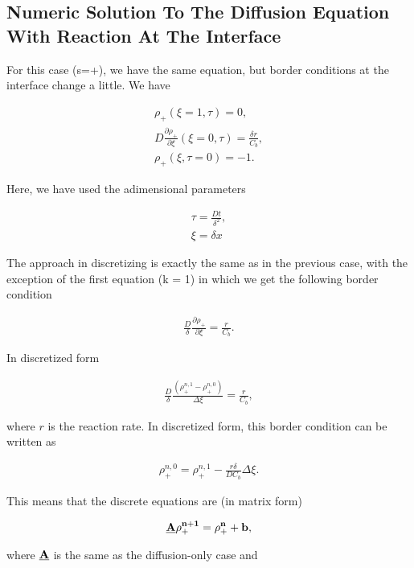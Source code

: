 \subsection{Numeric Solution To The Diffusion Equation With Reaction At The Interface}


For this case (s=+), we have the same equation, but border conditions at the interface change a little. We have

\begin{align}
	\rho_+(\xi = 1, \tau) = 0, \\
	D \frac{\partial \rho_+}{\partial \xi} (\xi = 0, \tau) = \frac{\delta r}{C_b},\\
	\rho_+(\xi, \tau = 0) = -1.
\end{align}

Here, we have used the adimensional parameters 

\begin{align}
    \tau = \frac{D t }{\delta ^2},\\
    \xi = \delta x
\end{align}


The approach in discretizing is exactly the same as in the previous case, with the exception of the first equation (k = 1) in which we get the following border condition

\begin{align}
    \frac{D}{\delta}\frac{\partial \rho_+}{\partial \xi} = \frac{r}{C_b}.
\end{align}

In discretized form

\begin{align}
    \frac{D}{\delta}\frac{(\rho_+^{n,1}-\rho_+^{n,0})}{\Delta \xi} = \frac{r}{C_b},
\end{align}

where $r$ is the reaction rate. In discretized form, this border condition can be written as

\begin{align}
    \rho_+^{n,0} = \rho_+^{n,1} - \frac{r\delta }{D C_b}\Delta \xi.
\end{align}


This means that the discrete equations are (in matrix form)

\begin{align}
    \bf{\underline{A}} \bf{\rho_+^{n+1}}  = \bf{\rho_+^n} + \bf{b},
\end{align}

where $\bf{\underline{A}}$ is the same as the diffusion-only case and 

